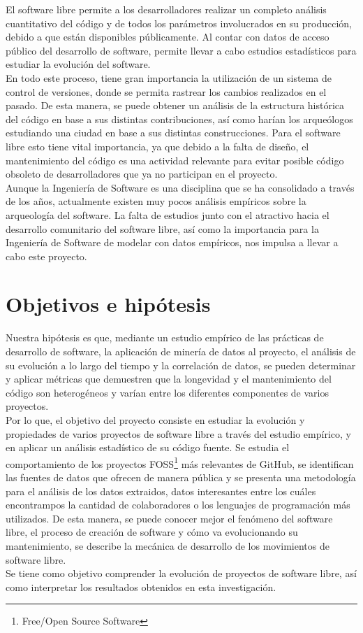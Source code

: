 \documentclass[a4paper, 12pt]{book}
\begin{document}
El software libre permite a los desarrolladores realizar un completo análisis cuantitativo del
código y de todos los parámetros involucrados en su producción, debido a que están disponibles públicamente.
Al contar con datos de acceso público del desarrollo de software, permite llevar a cabo estudios estadísticos
para estudiar la evolución del software.
\\En todo este proceso, tiene gran importancia la utilización de un sistema de control de versiones, donde se permita
rastrear los cambios realizados en el pasado. De esta manera, se puede obtener un análisis de la estructura histórica
del código en base a sus distintas contribuciones, así como harían los arqueólogos estudiando una ciudad en base a sus
distintas construcciones.
Para el software libre esto tiene vital importancia, ya que debido a la falta de diseño, el mantenimiento del código
es una actividad relevante para evitar posible código obsoleto de desarrolladores que ya no participan en el proyecto.
\\Aunque la Ingeniería de Software es una disciplina que se ha consolidado a través de los años, actualmente
existen muy pocos análisis empíricos sobre la arqueología del software. La falta de estudios junto con el atractivo hacia el
desarrollo comunitario del software libre, así como la importancia para la Ingeniería de Software de modelar con datos empíricos,
nos impulsa a llevar a cabo este proyecto.

\section{Objetivos e hipótesis}
\label{sec:objetivos}

Nuestra hipótesis es que, mediante un estudio empírico de las prácticas de desarrollo de software, la aplicación de minería de datos
al proyecto, el análisis de su evolución a lo largo del tiempo y la correlación de datos, se pueden determinar y aplicar métricas
que demuestren que la longevidad y el mantenimiento del código son heterogéneos y varían entre los diferentes componentes de varios proyectos.
\\Por lo que, el objetivo del proyecto consiste en estudiar la evolución y propiedades de varios proyectos de software libre a través del estudio
empírico, y en aplicar un análisis estadístico de su código fuente.
Se estudia el comportamiento de los proyectos FOSS\footnote{Free/Open Source Software} más relevantes de GitHub, se identifican las fuentes de datos
que ofrecen de manera pública y se presenta una metodología para el análisis de los datos extraidos, datos interesantes entre los cuáles encontrampos 
la cantidad de colaboradores o los lenguajes de programación más utilizados.
De esta manera, se puede conocer mejor el fenómeno del software libre, el proceso de creación de software y cómo va evolucionando su mantenimiento,
se describe la mecánica de desarrollo de los movimientos de software libre.
\\Se tiene como objetivo comprender la evolución de proyectos de software libre, así como interpretar los resultados obtenidos en esta investigación.
\end{document}
